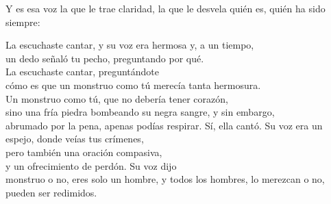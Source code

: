 Y es esa voz la que le trae claridad, la que le desvela quién es, quién ha sido siempre:

\begin{versopropio}
La escuchaste cantar, y su voz era hermosa y, a un tiempo,\\
un dedo señaló tu pecho, preguntando por qué.\\
La escuchaste cantar, preguntándote\\
cómo es que un monstruo como tú merecía tanta hermosura.\\
Un monstruo como tú, que no debería tener corazón,\\
sino una fría piedra bombeando su negra sangre, y sin embargo,\\
abrumado por la pena, apenas podías respirar.
\stanzabreak
Sí, ella cantó. Su voz era un espejo, donde veías tus crímenes,\\
pero también una oración compasiva,\\
y un ofrecimiento de perdón. Su voz dijo\\
monstruo o no, eres solo un hombre, y todos los hombres,
\stanzabreak
lo merezcan o no,\\
pueden ser redimidos.
\end{versopropio}
